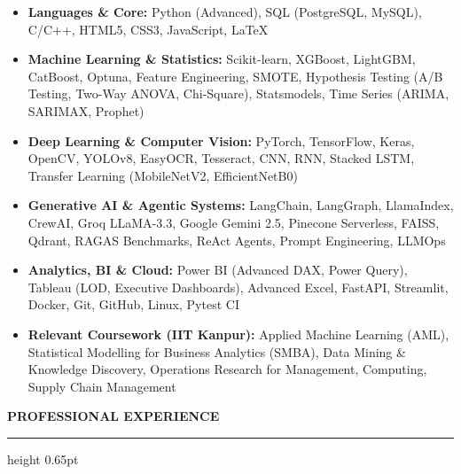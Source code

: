 \documentclass[10pt]{article}
\newcommand{\resumesection}[1]{%
  \vspace{4pt}%
  {\large \textbf{\uppercase{#1}}}%
  \vspace{1.5pt}%
  \hrule height 0.65pt%
  \vspace{3pt}%
}
\begin{document}
\begin{itemize}[noitemsep, topsep=1pt, partopsep=0pt, parsep=0.5pt]
    \item \textbf{Languages \& Core:} Python (Advanced), SQL (PostgreSQL, MySQL), C/C++, HTML5, CSS3, JavaScript, LaTeX
    \item \textbf{Machine Learning \& Statistics:} Scikit-learn, XGBoost, LightGBM, CatBoost, Optuna, Feature Engineering, SMOTE, Hypothesis Testing (A/B Testing, Two-Way ANOVA, Chi-Square), Statsmodels, Time Series (ARIMA, SARIMAX, Prophet)
    \item \textbf{Deep Learning \& Computer Vision:} PyTorch, TensorFlow, Keras, OpenCV, YOLOv8, EasyOCR, Tesseract, CNN, RNN, Stacked LSTM, Transfer Learning (MobileNetV2, EfficientNetB0)
    \item \textbf{Generative AI \& Agentic Systems:} LangChain, LangGraph, LlamaIndex, CrewAI, Groq LLaMA-3.3, Google Gemini 2.5, Pinecone Serverless, FAISS, Qdrant, RAGAS Benchmarks, ReAct Agents, Prompt Engineering, LLMOps
    \item \textbf{Analytics, BI \& Cloud:} Power BI (Advanced DAX, Power Query), Tableau (LOD, Executive Dashboards), Advanced Excel, FastAPI, Streamlit, Docker, Git, GitHub, Linux, Pytest CI
    \item \textbf{Relevant Coursework (IIT Kanpur):} Applied Machine Learning (AML), Statistical Modelling for Business Analytics (SMBA), Data Mining \& Knowledge Discovery, Operations Research for Management, Computing, Supply Chain Management
\end{itemize}

\resumesection{Professional Experience}
\end{document}
